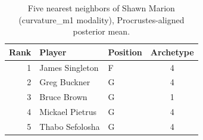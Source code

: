 \begin{table}[htbp]
  \centering\small
  \begin{tabular}{rllc}
    \toprule
    Rank & Player & Position & Archetype \\
    \midrule
    1 & James Singleton & F & 4 \\
    2 & Greg Buckner & G & 4 \\
    3 & Bruce Brown & G & 1 \\
    4 & Mickael Pietrus & G & 4 \\
    5 & Thabo Sefolosha & G & 4 \\
    \bottomrule
  \end{tabular}
  \caption{Five nearest neighbors of Shawn Marion (curvature_m1 modality), Procrustes-aligned posterior mean.}
  \label{tab:Shawn_Marion_neighbors_curvature_m1}
\end{table}

